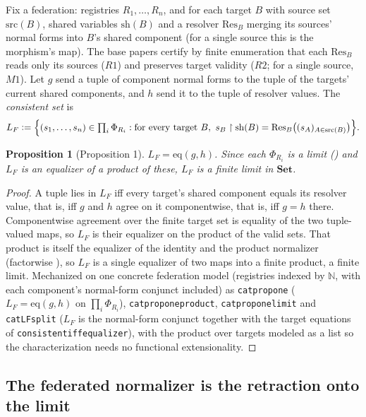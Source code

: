 \documentclass[11pt,a4paper]{article}
\theoremstyle{plain}
\newtheorem{proposition}[theorem]{Proposition}
\theoremstyle{definition}
\theoremstyle{remark}
\newcommand{\defeq}{\vcentcolon=}
\newcommand{\Res}{\mathrm{Res}}
\renewcommand{\_}{\origunderscore\allowbreak}
\begin{document}
Fix a federation: registries $R_1, \dots, R_n$, and for each target $B$ with source set
$\mathrm{src}(B)$, shared variables $\mathrm{sh}(B)$ and a resolver $\Res_B$ merging its sources'
normal forms into $B$'s shared component (for a single source this is the morphism's map). The base
papers certify by finite enumeration that each $\Res_B$ reads only its sources ($R1$) and preserves
target validity ($R2$; for a single source, $M1$). Let $g$ send a tuple of component normal forms to
the tuple of the targets' current shared components, and $h$ send it to the tuple of resolver values.
The \emph{consistent set} is
\[ L_F \defeq \Big\{ (s_1, \dots, s_n) \in \textstyle\prod_i \Phi_{R_i} :
   \text{for every target } B,\ s_B \restriction \mathrm{sh}(B)
   = \Res_B\big((s_{A})_{A \in \mathrm{src}(B)}\big) \Big\}. \]

\begin{proposition}[Proposition 1]
\label{prop:one}
$L_F = \mathrm{eq}(g, h)$. Since each $\Phi_{R_i}$ is a limit () and $L_F$ is an
equalizer of a product of these, $L_F$ is a finite limit in $\mathbf{Set}$.
\end{proposition}
\begin{proof}
A tuple lies in $L_F$ iff every target's shared component equals its resolver value, that is, iff $g$
and $h$ agree on it componentwise, that is, iff $g = h$ there. Componentwise agreement over the finite
target set is equality of the two tuple-valued maps, so $L_F$ is their equalizer on the product of
the valid sets. That product is itself the equalizer of the identity and the product normalizer
(factorwise ), so $L_F$ is a single equalizer of two maps into a finite product, a
finite limit. Mechanized on one concrete federation model (registries indexed by $\mathbb{N}$, with
each component's normal-form conjunct included) as \texttt{cat\_prop\_one} ($L_F = \mathrm{eq}(g,
h)$ on $\prod_i \Phi_{R_i}$), \texttt{cat\_prop\_one\_product}, \texttt{cat\_prop\_one\_limit} and
\texttt{cat\_LF\_split} ($L_F$ is the normal-form conjunct together with the target equations of
\texttt{consistent\_iff\_equalizer}), with the product over targets modeled as a list so the
characterization needs no functional extensionality.
\end{proof}

\subsection{The federated normalizer is the retraction onto the limit}
\end{document}
